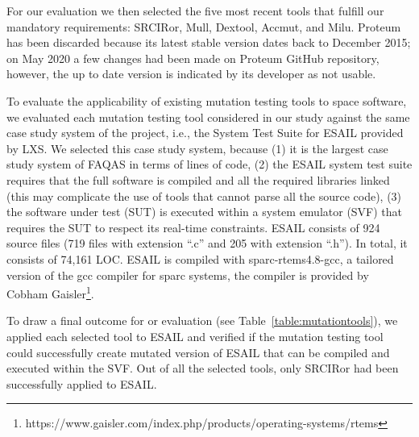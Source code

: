 For our evaluation we then selected the five most recent tools that fulfill our mandatory requirements: SRCIRor, Mull, Dextool, Accmut, and Milu. Proteum has been discarded because its latest stable version dates back to December 2015; on May 2020 a few changes had been made on Proteum GitHub repository, however, the up to date version is indicated by its developer as not usable.

To evaluate the applicability of existing mutation testing tools to space software, we evaluated each mutation testing tool considered in our study against the same case study system of the project, i.e., the System Test Suite for ESAIL provided by LXS. We selected this case study system, because (1) it is the largest case study system of FAQAS in terms of lines of code, (2) the ESAIL system test suite requires that the full software is compiled and all the required libraries linked (this may complicate the use of tools that cannot parse all the source code), (3) the software under test (SUT) is executed within a system emulator (SVF) that requires the SUT to respect its real-time constraints. ESAIL consists of 924 source files (719 files with extension ``.c'' and 205 with extension ``.h''). In total, it consists of 74,161 LOC. ESAIL is compiled with sparc-rtems4.8-gcc, a tailored version of the gcc compiler for sparc systems, the compiler is provided by Cobham Gaisler\footnote{https://www.gaisler.com/index.php/products/operating-systems/rtems}.

To draw a final outcome for or evaluation (see Table~\ref{table:mutationtools}), we applied each selected tool to ESAIL and verified if the mutation testing tool could successfully create mutated version of ESAIL that can be compiled and executed within the SVF.
Out of all the selected tools, only SRCIRor had been successfully applied to ESAIL.


